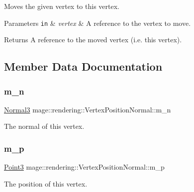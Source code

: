 Moves the given vertex to this vertex.


\begin{DoxyParams}[1]{Parameters}
\mbox{\tt in}  & {\em vertex} & A reference to the vertex to move. \\
\hline
\end{DoxyParams}
\begin{DoxyReturn}{Returns}
A reference to the moved vertex (i.\+e. this vertex). 
\end{DoxyReturn}


\subsection{Member Data Documentation}
\hypertarget{structmage_1_1rendering_1_1_vertex_position_normal_a5955e74eca6ef6c7516e6664370f8598}{}\label{structmage_1_1rendering_1_1_vertex_position_normal_a5955e74eca6ef6c7516e6664370f8598} 
\subsubsection{\texorpdfstring{m\+\_\+n}{m\_n}}
{\footnotesize\ttfamily \hyperlink{structmage_1_1_normal3}{Normal3} mage\+::rendering\+::\+Vertex\+Position\+Normal\+::m\+\_\+n}

The normal of this vertex. \hypertarget{structmage_1_1rendering_1_1_vertex_position_normal_a14824f61c8740e3472fccff1e3678515}{}\label{structmage_1_1rendering_1_1_vertex_position_normal_a14824f61c8740e3472fccff1e3678515} 
\subsubsection{\texorpdfstring{m\+\_\+p}{m\_p}}
{\footnotesize\ttfamily \hyperlink{structmage_1_1_point3}{Point3} mage\+::rendering\+::\+Vertex\+Position\+Normal\+::m\+\_\+p}

The position of this vertex. \hypertarget{structmage_1_1rendering_1_1_vertex_position_normal_aa8d64953c3186e90eef7a5120c601788}{}\label{structmage_1_1rendering_1_1_vertex_position_normal_aa8d64953c3186e90eef7a5120c601788} 
